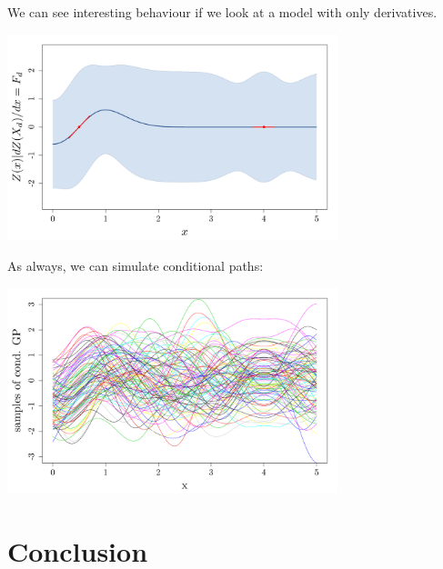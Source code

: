 \documentclass{beamer}
\begin{document}
\begin{frame}{}
We can see interesting behaviour if we look at a model with only derivatives.
	\begin{center}
	\includegraphics[height=6cm]{figures/R/exotic_deronly}
	\end{center}
\end{frame}

\begin{frame}{}
As always, we can simulate conditional paths:
	\begin{center}
	\includegraphics[height=6cm]{figures/R/exotic_simul}
	\end{center}
\end{frame}

\section[Concl.]{Conclusion}
\subsection{}
\end{document}
